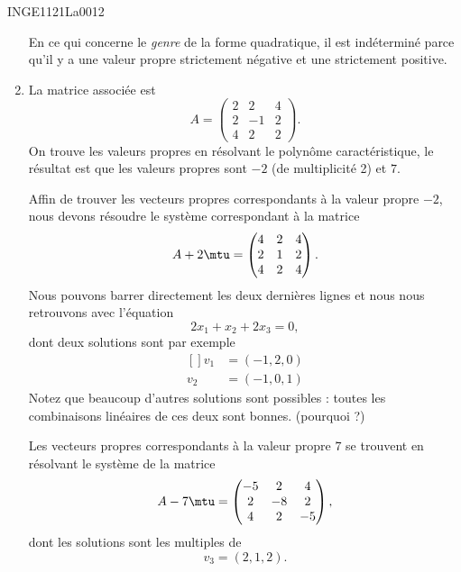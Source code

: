 \begin{corrige}{INGE1121La0012}
\begin{enumerate}
			En ce qui concerne le \emph{genre} de la forme quadratique, il est indéterminé parce qu'il y a une valeur propre strictement négative et une strictement positive.

	\item
		La matrice associée est
		\begin{equation}
			A=\begin{pmatrix}
				2	&	2	&	4	\\
				2	&	-1	&	2	\\
				4	&	2	&	2
			\end{pmatrix}.
		\end{equation}
		On trouve les valeurs propres en résolvant le polynôme caractéristique, le résultat est que les valeurs propres sont $-2$ (de multiplicité 2) et $7$.

		Affin de trouver les vecteurs propres correspondants à la valeur propre $-2$, nous devons résoudre le système correspondant à la matrice
		\begin{equation}
			A+2\mtu=
			\begin{pmatrix}
				4	&	2	&	4	\\
				2	&	1	&	2	\\
				4	&	2	&	4
			\end{pmatrix}.
		\end{equation}
		Nous pouvons barrer directement les deux dernières lignes et nous nous retrouvons avec l'équation
		\begin{equation}
			2x_1+x_2+2x_3=0,
		\end{equation}
		dont deux solutions sont par exemple
		\begin{equation}
			\begin{aligned}[]
				v_1&=(-1,2,0)\\
				v_2&=(-1,0,1)
			\end{aligned}
		\end{equation}
		Notez que beaucoup d'autres solutions sont possibles : toutes les combinaisons linéaires de ces deux sont bonnes. (pourquoi ?)

		Les vecteurs propres correspondants à la valeur propre $7$ se trouvent en résolvant le système de la matrice
		\begin{equation}
			A-7\mtu=
			\begin{pmatrix}
				-5	&	2	&	4	\\
				2	&	-8	&	2	\\
				4	&	2	&	-5
			\end{pmatrix},
		\end{equation}
		dont les solutions sont les multiples de 
		\begin{equation}
			v_3=(2,1,2).
		\end{equation}


\end{enumerate}
\end{corrige}

